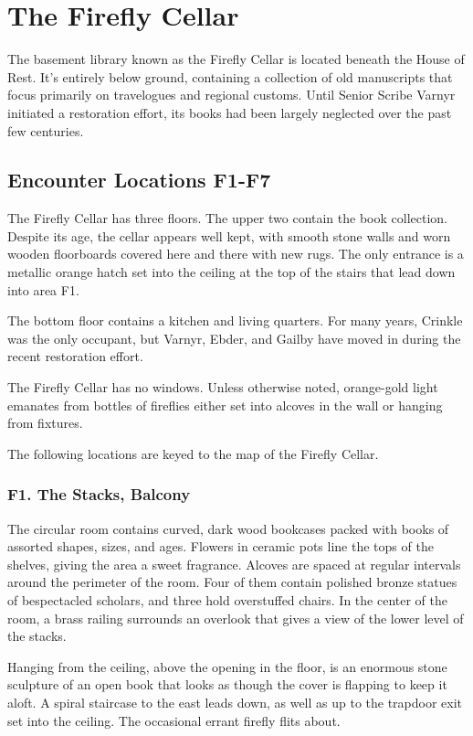 \documentclass[10pt,a4paper,twoside,bg=print,twocolumn,openany,nodeprecatedcode]{dndbook}
\begin{document}
\section{The Firefly Cellar}
The basement library known as the Firefly Cellar is located beneath the House of Rest. It's entirely below ground, containing a collection of old manuscripts that focus primarily on travelogues and regional customs. Until Senior Scribe Varnyr initiated a restoration effort, its books had been largely neglected over the past few centuries.

\subsection{Encounter Locations F1-F7}
The Firefly Cellar has three floors. The upper two contain the book collection. Despite its age, the cellar appears well kept, with smooth stone walls and worn wooden floorboards covered here and there with new rugs. The only entrance is a metallic orange hatch set into the ceiling at the top of the stairs that lead down into area F1.

The bottom floor contains a kitchen and living quarters. For many years, Crinkle was the only occupant, but Varnyr, Ebder, and Gailby have moved in during the recent restoration effort.

The Firefly Cellar has no windows. Unless otherwise noted, orange-gold light emanates from bottles of fireflies either set into alcoves in the wall or hanging from fixtures.

The following locations are keyed to the map of the Firefly Cellar.

\subsubsection{F1. The Stacks, Balcony}
\begin{DndReadAloud}{}
The circular room contains curved, dark wood bookcases packed with books of assorted shapes, sizes, and ages. Flowers in ceramic pots line the tops of the shelves, giving the area a sweet fragrance. Alcoves are spaced at regular intervals around the perimeter of the room. Four of them contain polished bronze statues of bespectacled scholars, and three hold overstuffed chairs. In the center of the room, a brass railing surrounds an overlook that gives a view of the lower level of the stacks.

Hanging from the ceiling, above the opening in the floor, is an enormous stone sculpture of an open book that looks as though the cover is flapping to keep it aloft. A spiral staircase to the east leads down, as well as up to the trapdoor exit set into the ceiling. The occasional errant firefly flits about.

\end{DndReadAloud}
\end{document}
